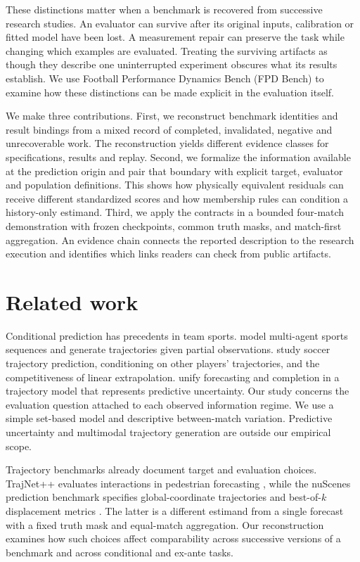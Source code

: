 \documentclass[10pt]{article}
\begin{document}
These distinctions matter when a benchmark is recovered from successive research studies. An evaluator can survive after its original inputs, calibration or fitted model have been lost. A measurement repair can preserve the task while changing which examples are evaluated. Treating the surviving artifacts as though they describe one uninterrupted experiment obscures what its results establish. We use Football Performance Dynamics Bench (FPD Bench) to examine how these distinctions can be made explicit in the evaluation itself.

We make three contributions. First, we reconstruct benchmark identities and result bindings from a mixed record of completed, invalidated, negative and unrecoverable work. The reconstruction yields different evidence classes for specifications, results and replay. Second, we formalize the information available at the prediction origin and pair that boundary with explicit target, evaluator and population definitions. This shows how physically equivalent residuals can receive different standardized scores and how membership rules can condition a history-only estimand. Third, we apply the contracts in a bounded four-match demonstration with frozen checkpoints, common truth masks, and match-first aggregation. An evidence chain connects the reported description to the research execution and identifies which links readers can check from public artifacts.

\section{Related work}

Conditional prediction has precedents in team sports. \citet{L1} model multi-agent sports sequences and generate trajectories given partial observations. \citet{L2} study soccer trajectory prediction, conditioning on other players' trajectories, and the competitiveness of linear extrapolation. \citet{L3} unify forecasting and completion in a trajectory model that represents predictive uncertainty. Our study concerns the evaluation question attached to each observed information regime. We use a simple set-based model and descriptive between-match variation. Predictive uncertainty and multimodal trajectory generation are outside our empirical scope.

Trajectory benchmarks already document target and evaluation choices. TrajNet++ evaluates interactions in pedestrian forecasting \citep{kothari2021}, while the nuScenes prediction benchmark specifies global-coordinate trajectories and best-of-$k$ displacement metrics \citep{nuscenesPrediction}. The latter is a different estimand from a single forecast with a fixed truth mask and equal-match aggregation. Our reconstruction examines how such choices affect comparability across successive versions of a benchmark and across conditional and ex-ante tasks.
\end{document}
